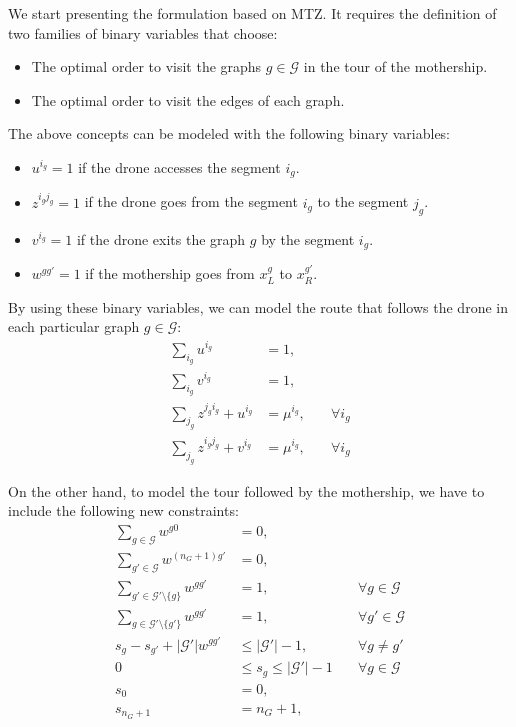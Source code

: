 We start presenting the formulation based on MTZ. It requires the definition of two families of binary variables that choose:
\begin{itemize}
    \item The optimal order to visit the  graphs $g\in\mathcal G$ in the tour of the mothership.
    \item The optimal order to visit the edges of each graph.
\end{itemize}

The above concepts can be modeled with the following binary variables:
\begin{itemize}
    \item $u^{i_g} = 1$ if the drone accesses the segment $i_g$.
    \item $z^{i_gj_g} = 1$ if the drone goes from the segment $i_g$ to the segment $j_g$.
    \item $v^{i_g} = 1$ if the drone exits the graph  $g$ by the segment $i_g$.
    \item $w^{gg'} = 1$ if the mothership goes from $x_L^g$ to $x_R^{g'}$.
\end{itemize}

By using these binary variables, we can model the route that follows the drone in each particular graph $g\in \mathcal G$:
\begin{align}
    \sum_{i_g} u^{i_g} & = 1, \label{DEnt2}\\%
    \sum_{i_g} v^{i_g} & = 1, \label{DExt}\\%
    \sum_{j_g} z^{j_gi_g} + u^{i_g} & = \mu^{i_g}, &\quad\forall i_g \label{DInu}\\
    \sum_{j_g} z^{i_gj_g} + v^{i_g} & = \mu^{i_g}, &\quad\forall i_g \label{DInv2}
\end{align}

On the other hand, to model the tour followed by the mothership, we have to include the following new constraints:
\begin{align}
    \sum_{g\in\mathcal G} w^{g0} & = 0, \label{TOrig}\\
    \sum_{g'\in\mathcal G} w^{(n_G+1) g'} & = 0, \label{TDest}\\
    \sum_{g'\in\mathcal G'\setminus\{g\}} w^{gg'} & = 1, \label{TExt} &\quad\forall g\in \mathcal G\\
    \sum_{g\in\mathcal G'\setminus\{g'\}} w^{gg'} & = 1, &\quad\forall g'\in \mathcal G\label{TEnt}\\
    s_g - s_{g'} + |\mathcal G'|w^{gg'} & \leq |\mathcal G'| - 1  , &\quad\forall g \neq g' \tag{MTZ$_3$} \label{MTZ3}\\
    0 & \leq s_g \leq |\mathcal G'| - 1 &\quad\forall g\in \mathcal G\tag{MTZ$_4$}\label{MTZ4}\\
    s_0 & = 0, \tag{MTZ$_5$}\label{MTZ5}\\
    s_{n_G+1}&=n_G+1, \tag{MTZ$_6$}\label{MTZ6}
\end{align}

